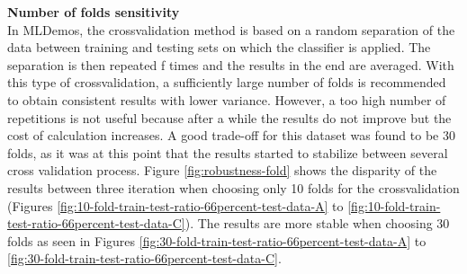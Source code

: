 \documentclass[a4paper,10pt]{article}
\begin{document}
\textbf{Number of folds sensitivity}\\
In MLDemos, the crossvalidation method is based on a random separation of the data between training and testing sets on which the classifier is applied. The separation is then repeated f times and the results in the end are averaged. With this type of crossvalidation, a sufficiently large number of folds is recommended to obtain consistent results with lower variance. However, a too high number of repetitions is not useful because after a while the results do not improve but the cost of calculation increases. A good trade-off for this dataset was found to be 30 folds, as it was at this point that the results started to stabilize between several cross validation process. Figure \ref{fig:robustness-fold} shows the disparity of the results between three iteration when choosing only 10 folds for the crossvalidation (Figures \ref{fig:10-fold-train-test-ratio-66percent-test-data-A} to \ref{fig:10-fold-train-test-ratio-66percent-test-data-C}). The results are more stable when choosing 30 folds as seen in Figures \ref{fig:30-fold-train-test-ratio-66percent-test-data-A} to \ref{fig:30-fold-train-test-ratio-66percent-test-data-C}.
\end{document}
